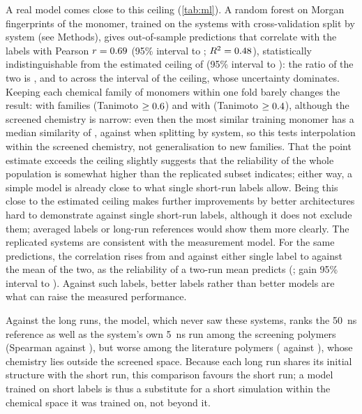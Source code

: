 \documentclass[journal=jcisd8,manuscript=article,email=true]{achemso}
\begin{document}
A real model comes close to this ceiling (\cref{tab:ml}). A random forest on Morgan fingerprints
of the monomer, trained on the \mlNSys{} systems with cross-validation split by system
(see Methods), gives out-of-sample predictions that
correlate with the labels with Pearson $r=0.69$ (95\% interval \mlCorrLo{} to \mlCorrHi;
$R^2=0.48$), statistically indistinguishable from the estimated ceiling of \techoEndCorr{}
(95\% interval \techoEndCorrLo{} to \techoEndCorrHi): the ratio of the two is \mlCeilRatio, and
\mlCeilRatioLo{} to \mlCeilRatioHi{} across the interval of the ceiling, whose uncertainty
dominates. Keeping each chemical family of monomers within one fold barely changes the result: \mlFamFineCorr{} with
\mlFamFineGroups{} families (Tanimoto $\geq0.6$) and \mlFamCoarseCorr{} with
\mlFamCoarseGroups{} (Tanimoto $\geq0.4$), although the screened chemistry is narrow:
even then the most similar training monomer has a median similarity of \mlFamCoarseNN, against
\mlNNSys{} when splitting by system, so this tests interpolation within the screened chemistry,
not generalisation to new families. That the point estimate exceeds the ceiling
slightly suggests that the reliability of the whole population is somewhat higher than the
replicated subset indicates; either way, a simple model is already close to what single short-run
labels allow. Being this close to the estimated ceiling makes further improvements by better
architectures hard to demonstrate against single short-run labels, although it does not exclude
them; averaged labels or long-run references would show them more clearly. The replicated
systems are consistent with the measurement model. For the same predictions, the correlation rises from
\mlRepA{} and \mlRepB{} against either single label to \mlRepMean{} against the mean of the two,
as the reliability of a two-run mean predicts (\mlRepMeanExp; gain 95\% interval \mlRepGainLo{}
to \mlRepGainHi). Against such labels, better labels rather than better models are what can
raise the measured performance.

Against the long runs, the model, which never saw these systems, ranks the
\SI{50}{\nano\second} reference as well as the system's own \SI{5}{\nano\second} run among the
screening polymers (Spearman \mlLongScreenModel{} against \mlLongScreenShort), but worse among the
literature polymers (\mlLongLitModel{} against \mlLongLitShort), whose chemistry lies outside
the screened space. Because each long run shares its initial structure with the short run, this
comparison favours the short run; a model trained on short labels is thus a substitute for a short
simulation within the chemical space it was trained on, not beyond it.
\end{document}
